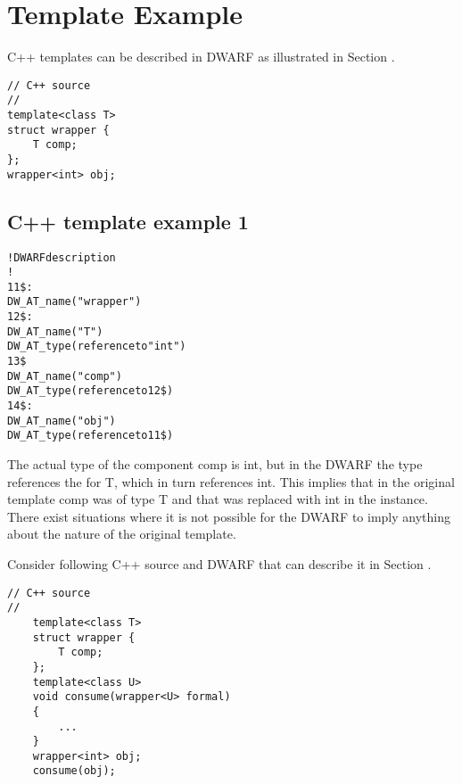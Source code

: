 \section{Template Example}
\label{app:templateexample}

C++ templates can be described in DWARF as illustrated in 
Section .



\begin{lstlisting}
// C++ source
//
template<class T>
struct wrapper {
    T comp;
};
wrapper<int> obj;
\end{lstlisting}

\subsection{C++ template example 1}
\label{app:ctemplateexample1}
\begin{alltt}
! DWARF description
!
11\$: 
        DW\_AT\_name("wrapper")
12\$: 
        DW\_AT\_name("T")
        DW\_AT\_type(reference to "int")
13\$ 
        DW\_AT\_name("comp")
        DW\_AT\_type(reference to 12\$)
14\$: 
        DW\_AT\_name("obj")
        DW\_AT\_type(reference to 11\$)
\end{alltt}

The actual type of the component comp is int, but in the DWARF
the type references the  for
T, which in turn references int. This implies that in the
original template comp was of type T and that was replaced
with int in the instance.  There exist situations where it is
not possible for the DWARF to imply anything about the nature
of the original template. 

Consider following C++ source and DWARF 
that can describe it in
Section .


\begin{lstlisting}
// C++ source
//
    template<class T>
    struct wrapper {
        T comp;
    };
    template<class U>
    void consume(wrapper<U> formal)
    {
        ...
    }
    wrapper<int> obj;
    consume(obj);
\end{lstlisting}

